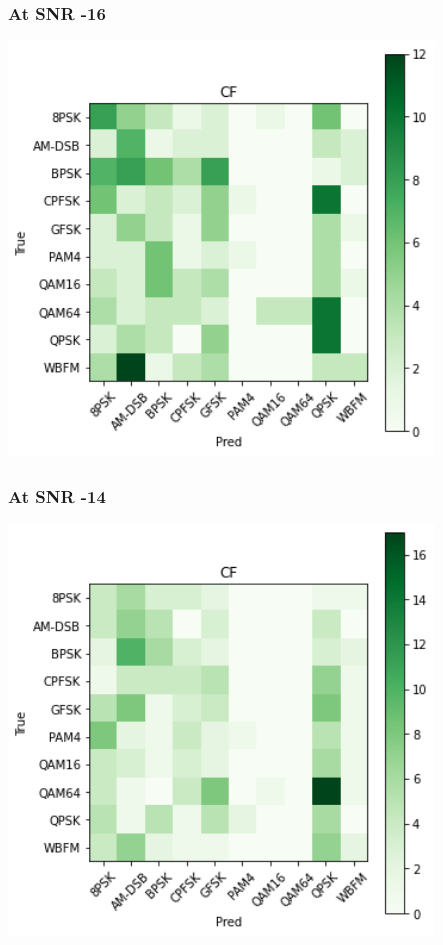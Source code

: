 \documentclass[12pt,a4paper]{article}
\begin{document}
\subsubsection{At SNR -16}
\begin{center}
\includegraphics[width=320pt]{imgs/snrs/snr3.png}
\end{center}

\subsubsection{At SNR -14}
\begin{center}
\includegraphics[width=320pt]{imgs/snrs/snr2.png}
\end{center}
\end{document}
